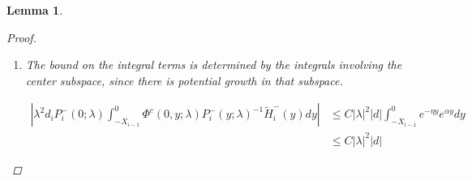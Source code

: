 \documentclass[12pt]{article}
\newtheorem{lemma}{Lemma}
\begin{document}
\begin{lemma}
\begin{proof}
\begin{enumerate}
To put this in terms of $c_i^-$, we use the expression

\[
c_i^+ = c_i^- + P_0^c(\lambda) D_i d + A_2(\lambda)_i^c(b, c^-, d) )
\]

from Lemma \ref{inv1}, together with the bound for $A_2$.

\begin{align*}
e^{-\nu(\lambda)X_i} c_i^+ &= e^{-\nu(\lambda)X_i} c_i^- 
+ e^{-\nu(\lambda)X_i} P_0^c(\lambda) D_i d + e^{-\nu(\lambda)X_i} A_2(\lambda)_i^c(b, d)\\
&= e^{-\nu(\lambda)X_i} c_i^- + \mathcal{O}\Big( e^{-(\alpha - \eta) X_i} ( |\lambda| + e^{-\alpha X_i} ) |d|) + e^{-(\alpha - \eta) X_i} (|b_i^+| + |b_{i+1}^-| + |c_i^-|)\\
&+ e^{-(\alpha - 2 \eta) X_i} |\lambda|^2|d| + e^{-(\alpha - \eta) X_i} |D_i||d| )
\end{align*}

Thus we have the expression for $e^{-\nu(\lambda)X_i} c_i^+$

\begin{align}\label{tildecminus2}
e^{-\nu(\lambda)X_i} c_i^+
&= e^{-\nu(\lambda)X_i} c_i^- + \mathcal{O}\Big( e^{-(\alpha - \eta) X_i} ( |b_i^+| + |b_{i+1}^-| + |c_i^-| + |\lambda||d| + |D_i||d|) \Big)
\end{align}

which gives us the overall estimate

\begin{align*}
&|(P_i^+(0; \lambda) - P^+(0))P_0^c(0) e^{-\nu(\lambda)X_i} c_i^+ + P_i^+(0; \lambda) (P_0^c(\lambda) - P_0^c(0)) e^{-\nu(\lambda)X_i} c_i^+| \\
&\leq C \Big( (e^{-\alpha X_m} + |\lambda|)( e^{-\nu(\lambda)X_i} c_i^- + e^{-(\alpha - \eta) X_i} ( |b_i^+| + |b_{i+1}^-| + |c_i^-| + |\lambda||d| + |D_i||d|) \Big) \\
&\leq C \Big( (e^{-\alpha X_m} + |\lambda|)( |\tilde{c}_i^-| + e^{-(\alpha - \eta) X_i} ( |b_i^+| + |b_{i+1}^-| + |c_i^-| + |\lambda||d| + |D_i||d|) \Big)
\end{align*}

\item The bound on the integral terms is determined by the integrals involving the center subspace, since there is potential growth in that subspace.

\begin{align*}
\left| \lambda^2 d_i P_i^-(0; \lambda) \int_{-X_{i-1}}^0 \Phi^c(0, y; \lambda) P_i^-(y; \lambda)^{-1} \tilde{H}_i^-(y) dy \right| &\leq C |\lambda|^2 |d| \int_{-X_{i-1}}^0 e^{-\eta y} e^{\alpha y} dy \\
&\leq C |\lambda|^2 |d|
\end{align*}


\end{enumerate}
\end{proof}
\end{lemma}
\end{document}
